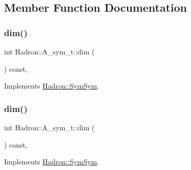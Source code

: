 \subsection{Member Function Documentation}
\mbox{\label{structHadron_1_1A__sym__t_a57e9460ee09050859f969d1f0cae0e92}} 
\subsubsection{\texorpdfstring{dim()}{dim()}\hspace{0.1cm}{\footnotesize\ttfamily [1/5]}}
{\footnotesize\ttfamily int Hadron\+::\+A\+\_\+sym\+\_\+t\+::dim (\begin{DoxyParamCaption}{ }\end{DoxyParamCaption}) const\hspace{0.3cm}{\ttfamily [inline]}, {\ttfamily [virtual]}}



Implements \mbox{\hyperlink{structHadron_1_1SymSym_ae57780f41b9f6c03c6056eed3677bd48}{Hadron\+::\+Sym\+Sym}}.

\mbox{\label{structHadron_1_1A__sym__t_a57e9460ee09050859f969d1f0cae0e92}} 
\subsubsection{\texorpdfstring{dim()}{dim()}\hspace{0.1cm}{\footnotesize\ttfamily [2/5]}}
{\footnotesize\ttfamily int Hadron\+::\+A\+\_\+sym\+\_\+t\+::dim (\begin{DoxyParamCaption}{ }\end{DoxyParamCaption}) const\hspace{0.3cm}{\ttfamily [inline]}, {\ttfamily [virtual]}}



Implements \mbox{\hyperlink{structHadron_1_1SymSym_ae57780f41b9f6c03c6056eed3677bd48}{Hadron\+::\+Sym\+Sym}}.

\mbox{\label{structHadron_1_1A__sym__t_a57e9460ee09050859f969d1f0cae0e92}} 
